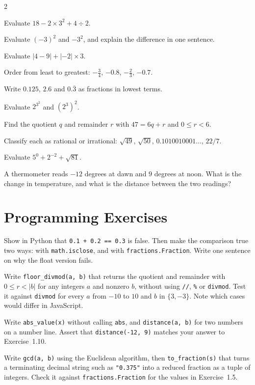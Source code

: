 \begin{multicols}{2}
\begin{exercises}
\item Evaluate $18 - 2 \times 3^2 + 4 \div 2$.
\item Evaluate $(-3)^2$ and $-3^2$, and explain the difference in one sentence.
\item Evaluate $|4 - 9| + |{-2}| \times 3$.
\item Order from least to greatest: $-\tfrac{3}{4}$, $-0.8$, $-\tfrac{2}{3}$, $-0.7$.
\item Write $0.125$, $2.6$ and $0.\overline{3}$ as fractions in lowest terms.
\item Evaluate $2^{3^2}$ and $(2^3)^2$.
\item Find the quotient $q$ and remainder $r$ with $47 = 6q + r$ and $0 \le r < 6$.
\item Classify each as rational or irrational: $\sqrt{49}$, $\sqrt{50}$, $0.1010010001\ldots$, $22/7$.
\item Evaluate $5^0 + 2^{-2} + \sqrt{81}$.
\item A thermometer reads $-12$ degrees at dawn and $9$ degrees at noon. What is the change in temperature, and what is the distance between the two readings?
\end{exercises}
\end{multicols}

\section{Programming Exercises}

\begin{codeexercises}
\item Show in Python that \lstinline!0.1 + 0.2 == 0.3! is false. Then make the comparison true two ways: with \lstinline!math.isclose!, and with \lstinline!fractions.Fraction!. Write one sentence on why the float version fails.
\item Write \lstinline!floor_divmod(a, b)! that returns the quotient and remainder with $0 \le r < |b|$ for any integers $a$ and nonzero $b$, without using \lstinline!//!, \lstinline!%! or \lstinline!divmod!. Test it against \lstinline!divmod! for every $a$ from $-10$ to $10$ and $b$ in $\{3, -3\}$. Note which cases would differ in JavaScript.
\item Write \lstinline!abs_value(x)! without calling \lstinline!abs!, and \lstinline!distance(a, b)! for two numbers on a number line. Assert that \lstinline!distance(-12, 9)! matches your answer to Exercise~1.10.
\item Write \lstinline!gcd(a, b)! using the Euclidean algorithm, then \lstinline!to_fraction(s)! that turns a terminating decimal string such as \lstinline!"0.375"! into a reduced fraction as a tuple of integers. Check it against \lstinline!fractions.Fraction! for the values in Exercise~1.5.
\end{codeexercises}
